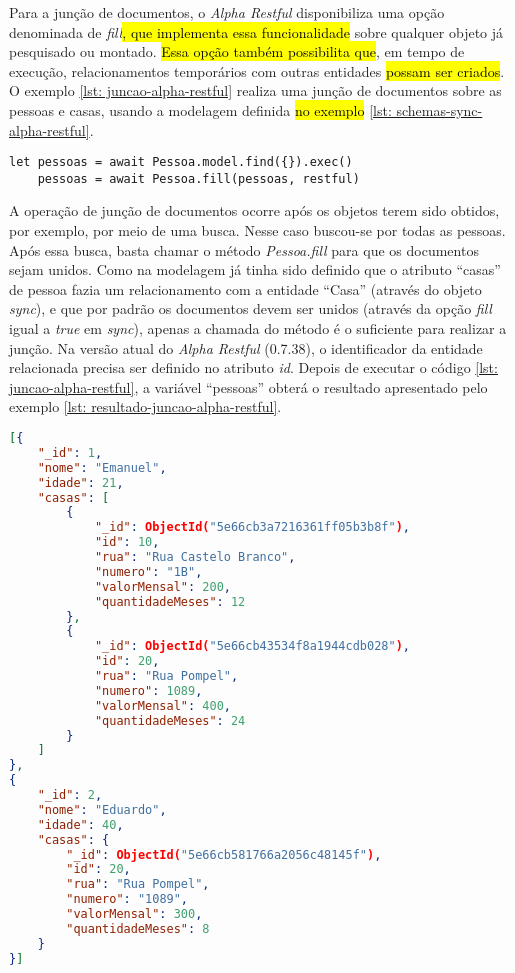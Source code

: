 Para a junção de documentos, o \textit{Alpha Restful} disponibiliza uma opção denominada de \textit{fill}\hl{, que implementa essa funcionalidade} sobre qualquer objeto já pesquisado ou montado. \hl{Essa opção também possibilita que}, em tempo de execução, relacionamentos temporários com outras entidades \hl{possam ser criados}. O exemplo \ref{lst: juncao-alpha-restful} realiza uma junção de documentos sobre as pessoas e casas, usando a modelagem definida \hl{no exemplo} \ref{lst: schemas-sync-alpha-restful}.

\begin{lstlisting}[style=ES6, caption={Junção de Documentos Com o \textit{Alpha Restful}\label{lst: juncao-alpha-restful}}]
	let pessoas = await Pessoa.model.find({}).exec()
	pessoas = await Pessoa.fill(pessoas, restful)
\end{lstlisting}

A operação de junção de documentos ocorre após os objetos terem sido obtidos, por exemplo, por meio de uma busca. Nesse caso buscou-se por todas as pessoas. Após essa busca, basta chamar o método \textit{Pessoa.fill} para que os documentos sejam unidos. Como na modelagem já tinha sido definido que o atributo ``casas'' de pessoa fazia um relacionamento com a entidade ``Casa'' (através do objeto \textit{sync}), e que por padrão os documentos devem ser unidos (através da opção \textit{fill} igual a \textit{true} em \textit{sync}), apenas a chamada do método é o suficiente para realizar a junção. Na versão atual do \textit{Alpha Restful} (0.7.38), o identificador da entidade relacionada precisa ser definido no atributo \textit{id}. Depois de executar o código \ref{lst: juncao-alpha-restful}, a variável ``pessoas'' obterá o resultado apresentado pelo exemplo \ref{lst: resultado-juncao-alpha-restful}.


\begin{lstlisting}[language=json, caption={Resultado da Junção de Documentos Com o \textit{Alpha Restful}\label{lst: resultado-juncao-alpha-restful}}]
[{
    "_id": 1,
    "nome": "Emanuel",
    "idade": 21,
    "casas": [
        {
            "_id": ObjectId("5e66cb3a7216361ff05b3b8f"),
            "id": 10,
            "rua": "Rua Castelo Branco",
            "numero": "1B",
            "valorMensal": 200,
            "quantidadeMeses": 12
        },
        {
            "_id": ObjectId("5e66cb43534f8a1944cdb028"),
            "id": 20,
            "rua": "Rua Pompel",
            "numero": 1089,
            "valorMensal": 400,
            "quantidadeMeses": 24
        }
    ]
},
{
    "_id": 2,
    "nome": "Eduardo",
    "idade": 40,
    "casas": {
        "_id": ObjectId("5e66cb581766a2056c48145f"),
        "id": 20,
        "rua": "Rua Pompel",
        "numero": "1089",
        "valorMensal": 300,
        "quantidadeMeses": 8
    }
}]
\end{lstlisting}

